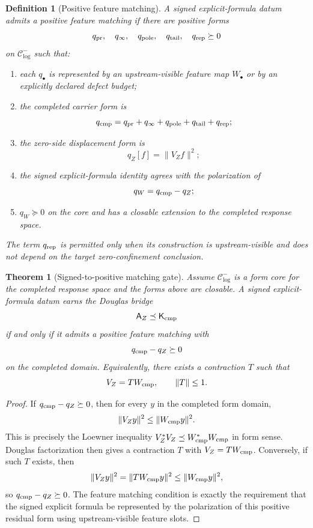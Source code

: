 \documentclass[11pt]{article}
\newtheorem{theorem}{Theorem}
\newtheorem{definition}{Definition}
\newcommand{\AZ}{\mathsf A_Z}
\newcommand{\Kcmp}{\mathsf K_{\rm cmp}}
\newcommand{\Ccore}{\mathcal C^-_{\log}}
\newcommand{\qcmp}{q_{\rm cmp}}
\newcommand{\qZ}{q_Z}
\newcommand{\qW}{q_W}
\begin{document}
\begin{definition}[Positive feature matching]
A signed explicit-formula datum admits a positive feature matching if there are positive forms
\[
  q_{\rm pr},\quad q_\infty,
  \quad q_{\rm pole},\quad q_{\rm tail},
  \quad q_{\rm rep}\succeq0
\]
on $\Ccore$ such that:
\begin{enumerate}[label=(\roman*)]
\item each $q_\bullet$ is represented by an upstream-visible feature map $W_\bullet$ or by an explicitly declared defect budget;
\item the completed carrier form is
\[
  \qcmp=q_{\rm pr}+q_\infty+q_{\rm pole}+q_{\rm tail}+q_{\rm rep};
\]
\item the zero-side displacement form is
\[
  \qZ[f]=\|V_Zf\|^2;
\]
\item the signed explicit-formula identity agrees with the polarization of
\[
  \qW=\qcmp-\qZ;
\]
\item $\qW\succeq0$ on the core and has a closable extension to the completed response space.
\end{enumerate}
The term $q_{\rm rep}$ is permitted only when its construction is upstream-visible and does not depend on the target zero-confinement conclusion.
\end{definition}

\begin{theorem}[Signed-to-positive matching gate]
Assume $\Ccore$ is a form core for the completed response space and the forms above are closable. A signed explicit-formula datum earns the Douglas bridge
\[
  \AZ\preceq\Kcmp
\]
if and only if it admits a positive feature matching with
\[
  \qcmp-\qZ\succeq0
\]
on the completed domain.
Equivalently, there exists a contraction $T$ such that
\[
  V_Z=T W_{\rm cmp},\qquad \|T\|\le1.
\]
\end{theorem}

\begin{proof}
If $\qcmp-\qZ\succeq0$, then for every $y$ in the completed form domain,
\[
  \|V_Zy\|^2\le\|W_{\rm cmp}y\|^2.
\]
This is precisely the Loewner inequality $V_Z^*V_Z\preceq W_{\rm cmp}^*W_{\rm cmp}$ in form sense. Douglas factorization then gives a contraction $T$ with $V_Z=T W_{\rm cmp}$.
Conversely, if such $T$ exists, then
\[
  \|V_Zy\|^2=\|TW_{\rm cmp}y\|^2\le\|W_{\rm cmp}y\|^2,
\]
so $\qcmp-\qZ\succeq0$. The feature matching condition is exactly the requirement that the signed explicit formula be represented by the polarization of this positive residual form using upstream-visible feature slots.
\end{proof}
\end{document}
